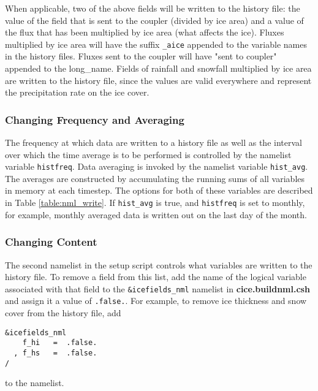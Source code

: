 When applicable, two of the above fields will be written to the
history file:  the value of the field that is sent to the coupler
(divided by ice area) and a value of the flux that has been multiplied by
ice area (what affects the ice). Fluxes multiplied by ice area will have
the suffix {\tt \_aice} appended to the variable names in the history files.
Fluxes sent to the coupler will have "sent to coupler" appended to the
long\_name.  Fields of rainfall and snowfall multiplied by ice area are
written to the history file, since the values are valid everywhere and
represent the precipitation rate on the ice cover.




\subsubsection{Changing Frequency and Averaging} 

The frequency at which data are written to a history file as well as the
interval over which the time average is to be performed is controlled
by the namelist variable {\tt histfreq}.  Data averaging is invoked
by the namelist variable {\tt hist\_avg}.  The averages are constructed
by accumulating the running sums of all variables in memory at each timestep.
The options for both of these variables are described in Table 
\ref{table:nml_write}.  If {\tt hist\_avg} is true, and {\tt histfreq}
is set to monthly, for example, monthly averaged data is written out on
the last day of the month.

\subsubsection{Changing Content} 
\label{change_content}

The second namelist in the setup script controls what variables are written
to the history file. To remove a field from this list, add the name of the
logical variable associated with that field to the {\tt \&icefields\_nml}
namelist in {\bf cice.buildnml.csh}
and assign it a value of {\tt .false.}.  For example, to remove
ice thickness and snow cover from the history file, add

\begin{verbatim}
&icefields_nml
    f_hi   =  .false.
  , f_hs   =  .false.
/
\end{verbatim}
to the namelist.  


